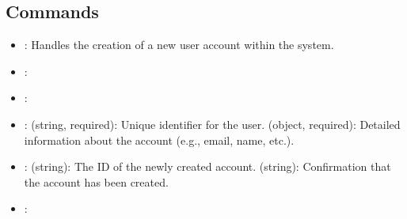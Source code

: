 \documentclass[letterpaper,10pt,english]{sphinxmanual}
\begin{document}
\subsection{Commands}
\label{\detokenize{crm_system/accounts_summary_service:commands}}
\sphinxAtStartPar
{}
\begin{itemize}
\item {} 
\sphinxAtStartPar
{}: Handles the creation of a new user account within the system.

\item {} 
\sphinxAtStartPar
{}: 

\item {} 
\sphinxAtStartPar
{}: 

\item {} 
\sphinxAtStartPar
{}:
\sphinxhyphen{}  (string, required): Unique identifier for the user.
\sphinxhyphen{}  (object, required): Detailed information about the account (e.g., email, name, etc.).

\item {} 
\sphinxAtStartPar
{}:
\sphinxhyphen{}  (string): The ID of the newly created account.
\sphinxhyphen{}  (string): Confirmation that the account has been created.

\item {} 
\sphinxAtStartPar
{}: 

\end{itemize}
\end{document}
